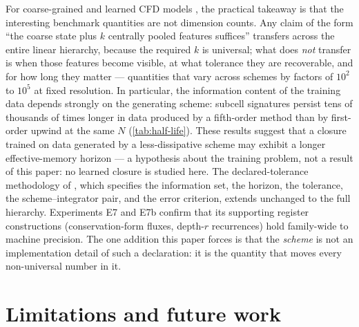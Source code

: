 \documentclass[pdflatex,sn-mathphys-num]{sn-jnl}%
\theoremstyle{thmstyleone}%
\theoremstyle{thmstyletwo}%
\theoremstyle{thmstylethree}%
\begin{document}
For coarse-grained and learned CFD models \cite{BarSinai2019,KochkovEtAl2021}, the practical takeaway is that the interesting benchmark quantities are not dimension counts.
Any claim of the form ``the coarse state plus $k$ centrally pooled features suffices'' transfers across the entire linear hierarchy, because the required $k$ is universal; what does \emph{not} transfer is when those features become visible, at what tolerance they are recoverable, and for how long they matter --- quantities that vary across schemes by factors of $10^2$ to $10^5$ at fixed resolution.
In particular, the information content of the training data depends strongly on the generating scheme: subcell signatures persist tens of thousands of times longer in data produced by a fifth-order method than by first-order upwind at the same $N$ (\cref{tab:half-life}).
These results suggest that a closure trained on data generated by a less-dissipative scheme may exhibit a longer effective-memory horizon --- a hypothesis about the training problem, not a result of this paper: no learned closure is studied here.
The declared-tolerance methodology of \cite{PolemitisChristakisDrikakis2026FVerasure, PolemitisChristakisDrikakis2026onestep}, which specifies the information set, the horizon, the tolerance, the scheme--integrator pair, and the error criterion, extends unchanged to the full hierarchy.
Experiments E7 and E7b confirm that its supporting register constructions (conservation-form fluxes, depth-$r$ recurrences) hold family-wide to machine precision.
The one addition this paper forces is that the \emph{scheme} is not an implementation detail of such a declaration: it is the quantity that moves every non-universal number in it.

\section{Limitations and future work}\label{sec:limitations}
\end{document}
